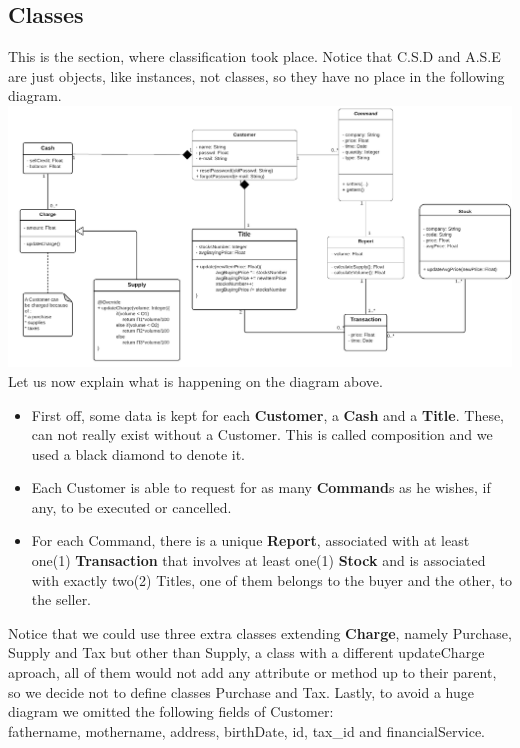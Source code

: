 \documentclass{article}
\begin{document}
\subsection{Classes}
This is the section, where classification took place. Notice that C.S.D and A.S.E are just objects, like instances, not classes, so they have no place in the following diagram.\\
\includegraphics[scale=0.25]{classes}
Let us now explain what is happening on the diagram above.\\
\begin{itemize}
\item First off, some data is kept for each \textbf{Customer}, a \textbf{Cash} and a \textbf{Title}. 
These, can not really exist without a Customer. 
This is called composition and we used a black diamond to denote it.
\item Each Customer is able to request for as many \textbf{Command}s as he wishes, if any, to be executed or cancelled.
\item For each Command, there is a unique \textbf{Report}, associated with at least one(1) \textbf{Transaction} that involves at least one(1) \textbf{Stock} and is associated with exactly two(2) Titles, one of them belongs to the buyer and the other, to the seller. 
\end{itemize}
Notice that we could use three extra classes extending \textbf{Charge}, namely Purchase, Supply and Tax but other than Supply, a class with a different updateCharge aproach, all of them would not add any attribute or method up to their parent, so we decide not to define classes Purchase and Tax. Lastly, to avoid a huge diagram we omitted the following fields of Customer:\\  
fathername, mothername, address, birthDate, id, tax{\_}id and financialService.
   
\newpage
\end{document}
